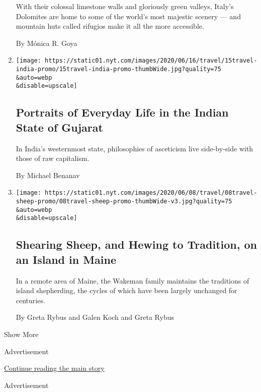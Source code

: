 \begin{enumerate}
  With their colossal limestone walls and gloriously green valleys,
  Italy's Dolomites are home to some of the world's most majestic
  scenery --- and mountain huts called rifugios make it all the more
  accessible.

  By Mónica R. Goya
\item
  \href{/2020/06/15/travel/gujarat-india-portraits.html}{}

  \texttt{[image: https://static01.nyt.com/images/2020/06/16/travel/15travel-india-promo/15travel-india-promo-thumbWide.jpg?quality=75\\\&auto=webp\\\&disable=upscale]}

  \hypertarget{portraits-of-everyday-life-in-the-indian-state-of-gujarat}{%
  \subsection{Portraits of Everyday Life in the Indian State of
  Gujarat}\label{portraits-of-everyday-life-in-the-indian-state-of-gujarat}}

  In India's westernmost state, philosophies of asceticism live
  side-by-side with those of raw capitalism.

  By Michael Benanav
\item
  \href{/2020/06/08/travel/lens-sheep-island-maine.html}{}

  \texttt{[image: https://static01.nyt.com/images/2020/06/08/travel/08travel-sheep-promo/08travel-sheep-promo-thumbWide-v3.jpg?quality=75\\\&auto=webp\\\&disable=upscale]}

  \hypertarget{shearing-sheep-and-hewing-to-tradition-on-an-island-in-maine}{%
  \subsection{Shearing Sheep, and Hewing to Tradition, on an Island in
  Maine}\label{shearing-sheep-and-hewing-to-tradition-on-an-island-in-maine}}

  In a remote area of Maine, the Wakeman family maintains the traditions
  of island shepherding, the cycles of which have been largely unchanged
  for centuries.

  By Greta Rybus and Galen Koch and Greta Rybus
\end{enumerate}

Show More

Advertisement

\protect\hyperlink{after-mid1}{Continue reading the main story}

Advertisement

